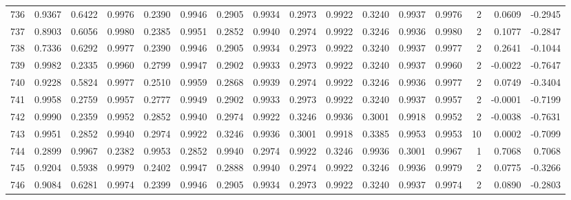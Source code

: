 \begin{tabular}{lrrrrrrrrrrrrrrr}
736 &      0.9367 &  0.6422 &  0.9976 &  0.2390 &  0.9946 &  0.2905 &  0.9934 &  0.2973 &  0.9922 &  0.3240 &   0.9937 &     0.9976 &      2 &                    0.0609 &                    -0.2945 \\
737 &      0.8903 &  0.6056 &  0.9980 &  0.2385 &  0.9951 &  0.2852 &  0.9940 &  0.2974 &  0.9922 &  0.3246 &   0.9936 &     0.9980 &      2 &                    0.1077 &                    -0.2847 \\
738 &      0.7336 &  0.6292 &  0.9977 &  0.2390 &  0.9946 &  0.2905 &  0.9934 &  0.2973 &  0.9922 &  0.3240 &   0.9937 &     0.9977 &      2 &                    0.2641 &                    -0.1044 \\
739 &      0.9982 &  0.2335 &  0.9960 &  0.2799 &  0.9947 &  0.2902 &  0.9933 &  0.2973 &  0.9922 &  0.3240 &   0.9937 &     0.9960 &      2 &                   -0.0022 &                    -0.7647 \\
740 &      0.9228 &  0.5824 &  0.9977 &  0.2510 &  0.9959 &  0.2868 &  0.9939 &  0.2974 &  0.9922 &  0.3246 &   0.9936 &     0.9977 &      2 &                    0.0749 &                    -0.3404 \\
741 &      0.9958 &  0.2759 &  0.9957 &  0.2777 &  0.9949 &  0.2902 &  0.9933 &  0.2973 &  0.9922 &  0.3240 &   0.9937 &     0.9957 &      2 &                   -0.0001 &                    -0.7199 \\
742 &      0.9990 &  0.2359 &  0.9952 &  0.2852 &  0.9940 &  0.2974 &  0.9922 &  0.3246 &  0.9936 &  0.3001 &   0.9918 &     0.9952 &      2 &                   -0.0038 &                    -0.7631 \\
743 &      0.9951 &  0.2852 &  0.9940 &  0.2974 &  0.9922 &  0.3246 &  0.9936 &  0.3001 &  0.9918 &  0.3385 &   0.9953 &     0.9953 &     10 &                    0.0002 &                    -0.7099 \\
744 &      0.2899 &  0.9967 &  0.2382 &  0.9953 &  0.2852 &  0.9940 &  0.2974 &  0.9922 &  0.3246 &  0.9936 &   0.3001 &     0.9967 &      1 &                    0.7068 &                     0.7068 \\
745 &      0.9204 &  0.5938 &  0.9979 &  0.2402 &  0.9947 &  0.2888 &  0.9940 &  0.2974 &  0.9922 &  0.3246 &   0.9936 &     0.9979 &      2 &                    0.0775 &                    -0.3266 \\
746 &      0.9084 &  0.6281 &  0.9974 &  0.2399 &  0.9946 &  0.2905 &  0.9934 &  0.2973 &  0.9922 &  0.3240 &   0.9937 &     0.9974 &      2 &                    0.0890 &                    -0.2803 \\

\end{tabular}
